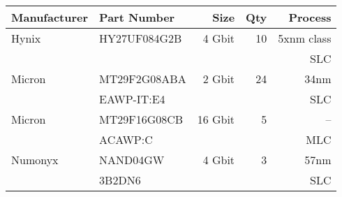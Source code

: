 \begin{tabular}{|l|l|r|r|r|}
\hline

{\bf Manufacturer}& {\bf Part Number} & {\bf Size} & {\bf Qty} & {\bf Process} \\

\hline
Hynix & HY27UF084G2B & 4 Gbit & 10 & 5xnm class\\
       & & & & SLC\\
\hline
Micron & MT29F2G08ABA & 2 Gbit & 24 & 34nm \\
       & EAWP-IT:E4 & & & SLC\\
\hline
Micron & MT29F16G08CB & 16 Gbit & 5 & -- \\
       & ACAWP:C & & & MLC\\
\hline
Numonyx & NAND04GW & 4 Gbit & 3 & 57nm \\
& 3B2DN6 & & & SLC\\
 
\hline

\end{tabular}
